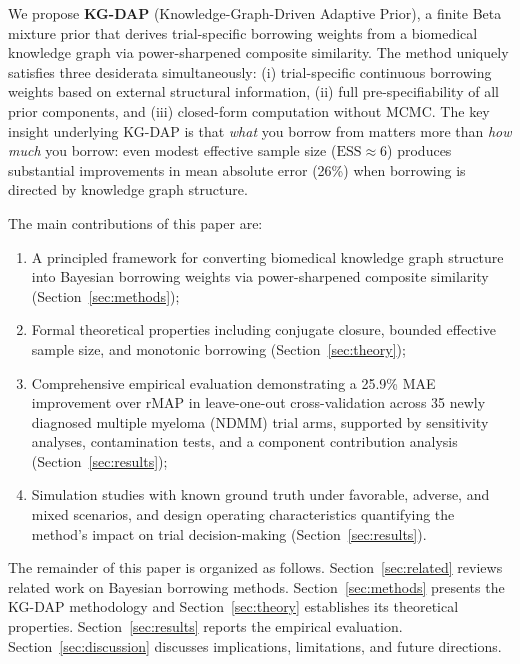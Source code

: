\documentclass[12pt]{article}
\newcommand{\ESS}{\mathrm{ESS}}
\begin{document}
We propose \textbf{KG-DAP} (Knowledge-Graph-Driven Adaptive Prior), a finite Beta mixture prior that derives trial-specific borrowing weights from a biomedical knowledge graph via power-sharpened composite similarity. The method uniquely satisfies three desiderata simultaneously: (i) trial-specific continuous borrowing weights based on external structural information, (ii) full pre-specifiability of all prior components, and (iii) closed-form computation without MCMC. The key insight underlying KG-DAP is that \emph{what} you borrow from matters more than \emph{how much} you borrow: even modest effective sample size ($\ESS \approx 6$) produces substantial improvements in mean absolute error (26\%) when borrowing is directed by knowledge graph structure.

The main contributions of this paper are:
\begin{enumerate}
    \item A principled framework for converting biomedical knowledge graph structure into Bayesian borrowing weights via power-sharpened composite similarity (Section~\ref{sec:methods});
    \item Formal theoretical properties including conjugate closure, bounded effective sample size, and monotonic borrowing (Section~\ref{sec:theory});
    \item Comprehensive empirical evaluation demonstrating a 25.9\% MAE improvement over rMAP in leave-one-out cross-validation across 35 newly diagnosed multiple myeloma (NDMM) trial arms, supported by sensitivity analyses, contamination tests, and a component contribution analysis (Section~\ref{sec:results});
    \item Simulation studies with known ground truth under favorable, adverse, and mixed scenarios, and design operating characteristics quantifying the method's impact on trial decision-making (Section~\ref{sec:results}).
\end{enumerate}

The remainder of this paper is organized as follows. Section~\ref{sec:related} reviews related work on Bayesian borrowing methods. Section~\ref{sec:methods} presents the KG-DAP methodology and Section~\ref{sec:theory} establishes its theoretical properties. Section~\ref{sec:results} reports the empirical evaluation. Section~\ref{sec:discussion} discusses implications, limitations, and future directions.

\end{document}
